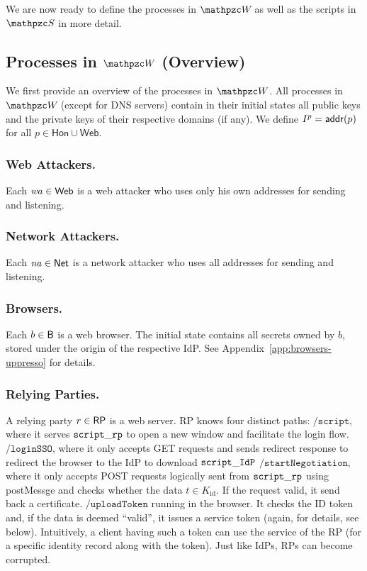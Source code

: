 \documentclass[letterpaper,onecolumn,10pt]{article}
\begin{document}
We are now ready to define the processes in $\websystem$ as well as
the scripts in $\scriptset$ in more detail. 

\subsection{Processes in $\bidsystem$ (Overview)}

We first provide an overview of the processes in $\bidsystem$. All
processes in $\websystem$ (except for DNS servers) contain in their initial states all public
keys and the private keys of their respective domains (if any). We
define $I^p=\mathsf{addr}(p)$ for all $p\in \mathsf{Hon} \cup \mathsf{Web}$.

\subsubsection{Web Attackers.}  Each $\mathit{wa} \in \mathsf{Web}$  is a
web attacker who uses only his own addresses for sending and listening. 

\subsubsection{Network Attackers.}  Each $\mathit{na} \in \mathsf{Net}$  is a
network attacker who uses all addresses for sending and listening. 

\subsubsection{Browsers.} Each $b \in \mathsf{B}$ is a web browser. 
The initial state contains all secrets owned by $b$, stored under the origin of the
respective IdP. See Appendix~\ref{app:browsers-uppresso} for details.

\subsubsection{Relying Parties.} 
A relying party $r \in \mathsf{RP}$ is a web server. RP knows four distinct paths: 
$\mathtt{/script}$, where it serves $\mathtt{script\_rp}$ to open a new window 
and facilitate the login flow.
$\mathtt{/loginSSO}$, where it only accepts GET requests and sends 
redirect response to redirect the browser to the IdP to download $\mathtt{script\_IdP}$
$\mathtt{/startNegotiation}$, where it only accepts POST requests logically sent 
from $\mathtt{script\_rp}$ using postMessge and checks whether the data $t\in K_\text{id}$.
If the request valid, it send back a certificate.
$\mathtt{/uploadToken}$ running in the browser. It checks the ID token and, 
if the data is deemed ``valid'', it issues a service token (again, for details, see below). 
Intuitively, a client having such a token can use the service of the RP 
(for a specific identity record along with the token). 
Just like IdPs, RPs can become corrupted.
\end{document}
